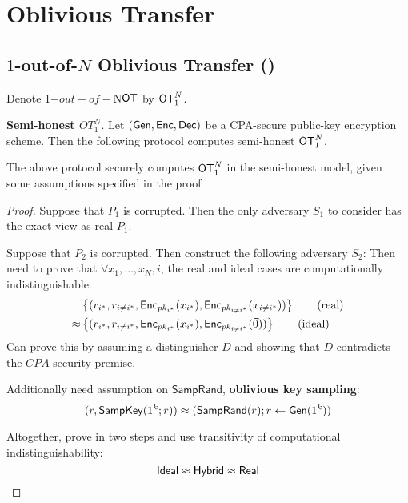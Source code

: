 

\section{Oblivious Transfer}

\subsection{$1$-out-of-$N$ Oblivious Transfer (\OT)}

Denote 1$-out-of-$N$ \mathsf{OT}$ by $\mathsf{OT}_1^N$.


\begin{prcl}
\textbf{Semi-honest $OT_1^N$}.
Let $(\mathsf{Gen}, \mathsf{Enc}, \mathsf{Dec})$ be a CPA-secure public-key encryption scheme.
Then the following protocol computes semi-honest $\mathsf{OT}_1^N$.
\end{prcl}

\begin{thm} \label{thm:1N-OT-CPA}
The above protocol securely computes $\mathsf{OT}_1^N$ in the semi-honest model, given some assumptions specified in the proof
\end{thm}
\begin{proof}
Suppose that $P_1$ is corrupted. 
Then the only adversary $S_1$ to consider has the exact view as real $P_1$.

Suppose that $P_2$ is corrupted.
Then construct the following adversary $S_2$:
Then need to prove that $\forall x_1, \dots, x_N, i$, the real and ideal cases are computationally indistinguishable:
\begin{align*}
    &\left\{(r_{i^*}, r_{i \neq i^*}, \mathsf{Enc}_{pk_{i^*}}(x_{i^*}), \mathsf{Enc}_{pk_{i \neq i^*}}(x_{i \neq i^*}))\right\}
    \tag{real}
    \\
    \approx 
    &\left\{(r_{i^*}, r_{i \neq i^*}, \mathsf{Enc}_{pk_{i^*}}(x_{i^*}), \mathsf{Enc}_{pk_{i \neq i^*}}(\vec{0}))\right\}
    \tag{ideal}
\end{align*}
Can prove this by assuming a distinguisher $D$ and showing that $D$ contradicts the $CPA$ security premise.

Additionally need assumption on $\mathsf{SampRand}$, \textbf{oblivious key sampling}:
\[
    (r, \mathsf{SampKey}(1^k; r)) \approx 
    (\mathsf{SampRand}(r); r \gets \mathsf{Gen}(1^k))
\]

Altogether, prove in two steps and use transitivity of computational indistinguishability:
\[
    \mathsf{Ideal} \approx \mathsf{Hybrid} \approx \mathsf{Real} 
\]
\end{proof}

